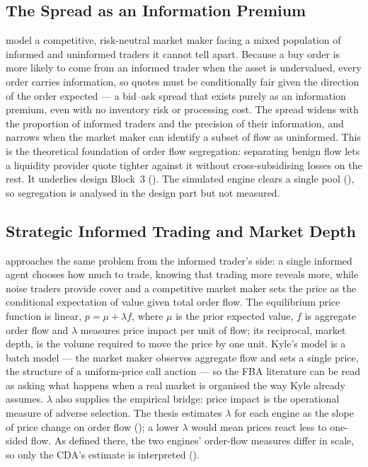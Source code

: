 \subsection{The Spread as an Information Premium}

\citet{glosten1985bid} model a competitive, risk-neutral market maker
facing a mixed population of informed and uninformed traders it cannot
tell apart. Because a buy order is more likely to come from an informed
trader when the asset is undervalued, every order carries information, so
quotes must be conditionally fair given the direction of the order
expected --- a bid--ask spread that exists purely as an information
premium, even with no inventory risk or processing cost. The spread widens
with the proportion of informed traders and the precision of their
information, and narrows when the market maker can identify a subset of
flow as uninformed. This is the theoretical foundation of order flow
segregation: separating benign flow lets a liquidity provider quote
tighter against it without cross-subsidising losses on the rest. It
underlies design Block~3 (). The simulated engine
clears a single pool (), so segregation is analysed
in the design part but not measured.

\subsection{Strategic Informed Trading and Market Depth}

\citet{kyle1985continuous} approaches the same problem from the informed
trader's side: a single informed agent chooses how much to trade, knowing
that trading more reveals more, while noise traders provide cover and a
competitive market maker sets the price as the conditional expectation of
value given total order flow. The equilibrium price function is linear,
$p = \mu + \lambda f$, where $\mu$ is the prior expected value, $f$ is
aggregate order flow and
$\lambda$ measures price impact per unit of flow; its reciprocal, market
depth, is the volume required to move the price by one unit. Kyle's model
is a batch model --- the market maker observes aggregate flow and sets a
single price, the structure of a uniform-price call auction --- so the FBA
literature can be read as asking what happens when a real market is
organised the way Kyle already assumes. $\lambda$ also supplies the
empirical bridge: price impact is the operational measure of adverse
selection. The thesis estimates $\lambda$ for each engine as the slope of
price change on order flow (); a lower $\lambda$
would mean prices react less to one-sided flow. As defined there, the two
engines' order-flow measures differ in scale, so only the CDA's estimate
is interpreted ().

